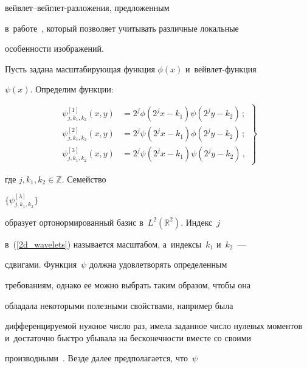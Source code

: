 вейв\-лет--вейг\-лет-раз\-ло\-же\-ния, предложенным 


в~работе~\cite{Don95}, который позволяет учитывать различные локальные 


особенности изображений.





Пусть задана масштабирующая функция $\phi(x)$ и~вейв\-лет-функ\-ция 


$\psi(x)$. Определим функции:


\begin{equation}


\left.


\begin{array}{rl}                                                          


\psi_{j,k_1,k_2}^{[1]} (x,y) &= 2^j \phi(2^j x - k_1) \psi(2^j y - 


k_2)\,;\\[6pt]


\psi_{j,k_1,k_2}^{[2]} (x,y) &= 2^j \psi(2^j x - k_1) \phi(2^j y - 


k_2)\,;\\[6pt]


\psi_{j,k_1,k_2}^{[3]} (x,y) &= 2^j \psi(2^j x - k_1) \psi(2^j y - 


k_2)\,,


\end{array}


\right\}


\label{2d_wavelets}


\end{equation}


где $j,k_1,k_2\in \mathbb{Z}$. Семейство 


$\{\psi^{[\lambda]}_{j,k_1,k_2}\}$


образует ортонормированный базис в~$L^2(\mathbb{R}^2)$. Индекс~$j$ 


в~(\ref{2d_wavelets}) называется масштабом, а~индексы~$k_1$ и~$k_2$~---


сдвигами. Функция~$\psi$ должна удовлетворять определенным


требованиям, однако ее можно выбрать таким образом, чтобы она


обладала некоторыми полезными свойствами, например была


дифференцируемой нужное число раз, имела заданное число нулевых моментов и~достаточно быстро убывала на бесконечности вместе со своими 


производными~\cite{Mal99}. Везде далее предполагается, что~$\psi$ 


